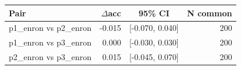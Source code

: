 \begin{tabular}{lrcr}
\toprule
Pair & $\Delta$acc & 95\% CI & N common \\
\midrule
p1_enron vs p2_enron & -0.015 & [-0.070, 0.040] & 200 \\
p1_enron vs p3_enron & 0.000 & [-0.030, 0.030] & 200 \\
p2_enron vs p3_enron & 0.015 & [-0.045, 0.070] & 200 \\
\bottomrule
\end{tabular}
